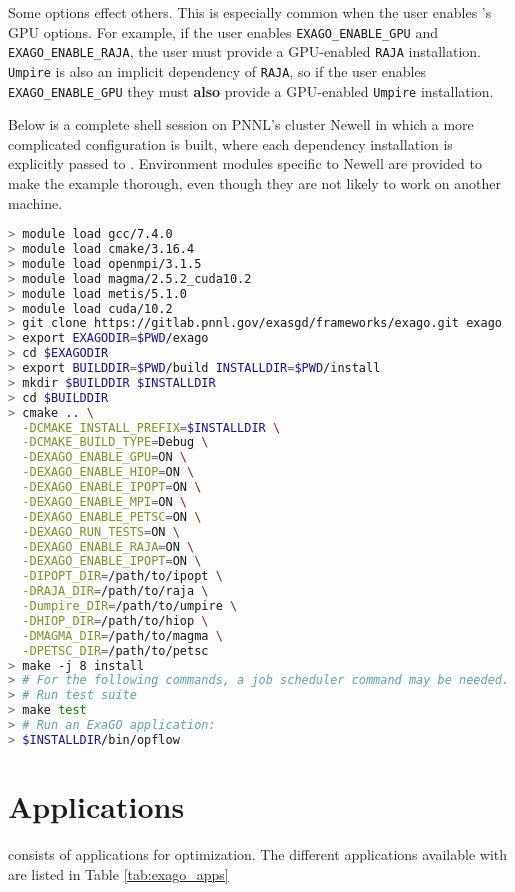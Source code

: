 Some \cmake options effect others.
This is especially common when the user enables \exago's GPU options.
For example, if the user enables \texttt{EXAGO\_ENABLE\_GPU} and \texttt{EXAGO\_ENABLE\_RAJA}, the user must provide a GPU-enabled \texttt{RAJA} installation.
\texttt{Umpire} is also an implicit dependency of \texttt{RAJA}, so if the user enables \texttt{EXAGO\_ENABLE\_GPU} they must \textbf{also} provide a GPU-enabled \texttt{Umpire} installation.

Below is a complete shell session on PNNL's cluster Newell in which a more complicated \exago configuration is built, where each dependency installation is explicitly passed to \cmake.
Environment modules specific to Newell are provided to make the example thorough, even though they are not likely to work on another machine.

\begin{lstlisting}[language=bash,caption={\exago build with all options enabled}]
> module load gcc/7.4.0
> module load cmake/3.16.4
> module load openmpi/3.1.5
> module load magma/2.5.2_cuda10.2
> module load metis/5.1.0
> module load cuda/10.2
> git clone https://gitlab.pnnl.gov/exasgd/frameworks/exago.git exago
> export EXAGODIR=$PWD/exago
> cd $EXAGODIR
> export BUILDDIR=$PWD/build INSTALLDIR=$PWD/install
> mkdir $BUILDDIR $INSTALLDIR
> cd $BUILDDIR
> cmake .. \
  -DCMAKE_INSTALL_PREFIX=$INSTALLDIR \
  -DCMAKE_BUILD_TYPE=Debug \
  -DEXAGO_ENABLE_GPU=ON \
  -DEXAGO_ENABLE_HIOP=ON \
  -DEXAGO_ENABLE_IPOPT=ON \
  -DEXAGO_ENABLE_MPI=ON \
  -DEXAGO_ENABLE_PETSC=ON \
  -DEXAGO_RUN_TESTS=ON \
  -DEXAGO_ENABLE_RAJA=ON \
  -DEXAGO_ENABLE_IPOPT=ON \
  -DIPOPT_DIR=/path/to/ipopt \
  -DRAJA_DIR=/path/to/raja \
  -Dumpire_DIR=/path/to/umpire \
  -DHIOP_DIR=/path/to/hiop \
  -DMAGMA_DIR=/path/to/magma \
  -DPETSC_DIR=/path/to/petsc
> make -j 8 install
> # For the following commands, a job scheduler command may be needed.
> # Run test suite
> make test
> # Run an ExaGO application:
> $INSTALLDIR/bin/opflow
\end{lstlisting}

\section{Applications}
\exago consists of applications for optimization. The different applications available with \exago are listed in Table \ref{tab:exago_apps}

